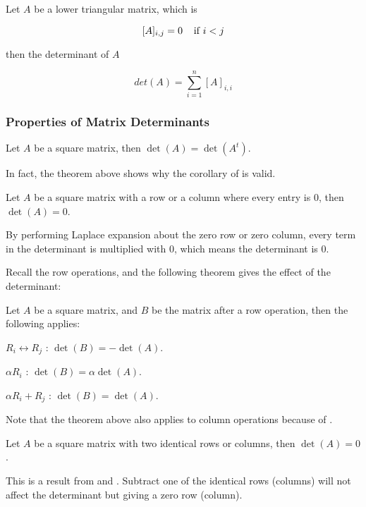 \documentclass[a4paper,12pt]{article}
\begin{document}
\begin{crl}
  Let $A$ be a lower triangular matrix, which is

  $$[A]_{i,j}=0\;\;\;\;\text{if }i<j$$\s

  then the determinant of $A$

  $$det(A)=\sum_{i=1}^{n}[A]_{i,i}$$
\end{crl}

\subsubsection{Properties of Matrix Determinants}
\begin{thm}
  Let $A$ be a square matrix, then $\det(A)=\det(A^{t})$.
\end{thm}\n

In fact, the theorem above shows why the corollary of \rthm[\sctr{1}] is valid.\n

\begin{thm}
  Let $A$ be a square matrix with a row or a column where every entry is $0$, then $\det(A)=0$.\n

  \prf By performing Laplace expansion about the zero row or zero column, every term in the determinant is multiplied with $0$, which means the determinant is $0$.
\end{thm}\n

Recall the row operations, and the following theorem gives the effect of the determinant:

\begin{thm}
  Let $A$ be a square matrix, and $B$ be the matrix after a row operation, then the following applies:

  \begin{alist}
    \item $R_{i}\leftrightarrow R_{j}$ : $\det(B)=-\det(A)$.
    \item $\alpha R_{i}$ : $\det(B)=\alpha\det(A)$.
    \item $\alpha R_{i}+R_{j}$ : $\det(B)=\det(A)$.
  \end{alist}
\end{thm}\n

Note that the theorem above also applies to column operations because of \rthm[\sctr{2}].\n

\begin{thm}
  Let $A$ be a square matrix with two identical rows or columns, then $\det(A)=0$.\n
  
  \prf This is a result from \rthm[\sctr{2}] and \rthm[\sctr{1}]. Subtract one of the identical rows (columns) will not affect the determinant but giving a zero row (column).
\end{thm}\n
\end{document}
